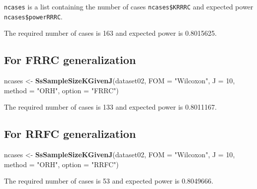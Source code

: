 \documentclass[]{book}
\newenvironment{Shaded}{\begin{snugshade}}{\end{snugshade}}
\newcommand{\CommentTok}[1]{\textcolor[rgb]{0.56,0.35,0.01}{\textit{#1}}}
\newcommand{\DataTypeTok}[1]{\textcolor[rgb]{0.13,0.29,0.53}{#1}}
\newcommand{\DecValTok}[1]{\textcolor[rgb]{0.00,0.00,0.81}{#1}}
\newcommand{\KeywordTok}[1]{\textcolor[rgb]{0.13,0.29,0.53}{\textbf{#1}}}
\newcommand{\NormalTok}[1]{#1}
\newcommand{\StringTok}[1]{\textcolor[rgb]{0.31,0.60,0.02}{#1}}
\begin{document}
\texttt{ncases} is a list containing the number of cases \texttt{ncases\$KRRRC} and expected power \texttt{ncases\$powerRRRC}.

\begin{Shaded}
\end{Shaded}

The required number of cases is 163 and expected power is 0.8015625.

\hypertarget{for-frrc-generalization}{%
\subsection{For FRRC generalization}\label{for-frrc-generalization}}

\begin{Shaded}
\begin{Highlighting}[]
\NormalTok{ncases <-}\StringTok{ }\KeywordTok{SsSampleSizeKGivenJ}\NormalTok{(dataset02, }\DataTypeTok{FOM =} \StringTok{"Wilcoxon"}\NormalTok{, }\DataTypeTok{J =} \DecValTok{10}\NormalTok{, }\DataTypeTok{method =} \StringTok{"ORH"}\NormalTok{, }\DataTypeTok{option =} \StringTok{"FRRC"}\NormalTok{)}
\end{Highlighting}
\end{Shaded}

The required number of cases is 133 and expected power is 0.8011167.

\hypertarget{for-rrfc-generalization}{%
\subsection{For RRFC generalization}\label{for-rrfc-generalization}}

\begin{Shaded}
\begin{Highlighting}[]
\NormalTok{ncases <-}\StringTok{ }\KeywordTok{SsSampleSizeKGivenJ}\NormalTok{(dataset02, }\DataTypeTok{FOM =} \StringTok{"Wilcoxon"}\NormalTok{, }\DataTypeTok{J =} \DecValTok{10}\NormalTok{, }\DataTypeTok{method =} \StringTok{"ORH"}\NormalTok{, }\DataTypeTok{option =} \StringTok{"RRFC"}\NormalTok{)}
\end{Highlighting}
\end{Shaded}

The required number of cases is 53 and expected power is 0.8049666.
\end{document}
